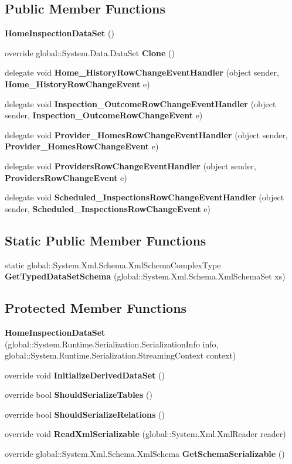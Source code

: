 \subsection*{Public Member Functions}
\begin{DoxyCompactItemize}
\item 
\textbf{ Home\+Inspection\+Data\+Set} ()
\item 
override global\+::\+System.\+Data.\+Data\+Set \textbf{ Clone} ()
\item 
delegate void \textbf{ Home\+\_\+\+History\+Row\+Change\+Event\+Handler} (object sender, \textbf{ Home\+\_\+\+History\+Row\+Change\+Event} e)
\item 
delegate void \textbf{ Inspection\+\_\+\+Outcome\+Row\+Change\+Event\+Handler} (object sender, \textbf{ Inspection\+\_\+\+Outcome\+Row\+Change\+Event} e)
\item 
delegate void \textbf{ Provider\+\_\+\+Homes\+Row\+Change\+Event\+Handler} (object sender, \textbf{ Provider\+\_\+\+Homes\+Row\+Change\+Event} e)
\item 
delegate void \textbf{ Providers\+Row\+Change\+Event\+Handler} (object sender, \textbf{ Providers\+Row\+Change\+Event} e)
\item 
delegate void \textbf{ Scheduled\+\_\+\+Inspections\+Row\+Change\+Event\+Handler} (object sender, \textbf{ Scheduled\+\_\+\+Inspections\+Row\+Change\+Event} e)
\end{DoxyCompactItemize}
\subsection*{Static Public Member Functions}
\begin{DoxyCompactItemize}
\item 
static global\+::\+System.\+Xml.\+Schema.\+Xml\+Schema\+Complex\+Type \textbf{ Get\+Typed\+Data\+Set\+Schema} (global\+::\+System.\+Xml.\+Schema.\+Xml\+Schema\+Set xs)
\end{DoxyCompactItemize}
\subsection*{Protected Member Functions}
\begin{DoxyCompactItemize}
\item 
\textbf{ Home\+Inspection\+Data\+Set} (global\+::\+System.\+Runtime.\+Serialization.\+Serialization\+Info info, global\+::\+System.\+Runtime.\+Serialization.\+Streaming\+Context context)
\item 
override void \textbf{ Initialize\+Derived\+Data\+Set} ()
\item 
override bool \textbf{ Should\+Serialize\+Tables} ()
\item 
override bool \textbf{ Should\+Serialize\+Relations} ()
\item 
override void \textbf{ Read\+Xml\+Serializable} (global\+::\+System.\+Xml.\+Xml\+Reader reader)
\item 
override global\+::\+System.\+Xml.\+Schema.\+Xml\+Schema \textbf{ Get\+Schema\+Serializable} ()
\end{DoxyCompactItemize}
